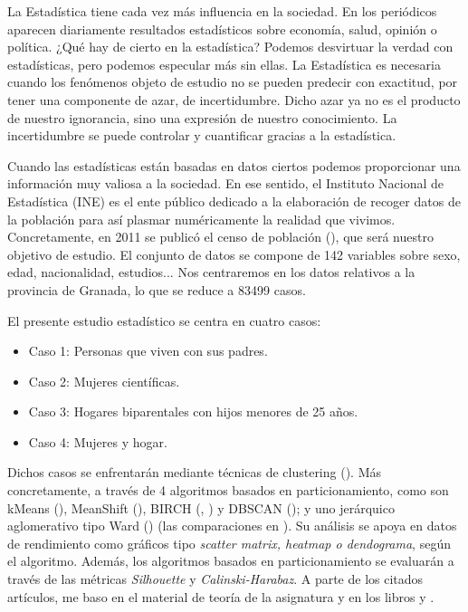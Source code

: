 La Estadística tiene cada vez más influencia en la sociedad. En los periódicos aparecen diariamente resultados estadísticos sobre economía, salud, opinión o política. ¿Qué hay de cierto en la estadística? Podemos desvirtuar la verdad con estadísticas, pero podemos especular más sin ellas. La Estadística es necesaria cuando los fenómenos objeto de estudio no se pueden predecir con exactitud, por tener una componente de azar, de incertidumbre. Dicho azar ya no es el producto de nuestro ignorancia, sino una expresión de nuestro conocimiento. La incertidumbre se puede controlar y cuantificar gracias a la estadística.

Cuando las estadísticas están basadas en datos ciertos podemos proporcionar una información muy valiosa a la sociedad. En ese sentido, el Instituto Nacional de Estadística (INE) es el ente público dedicado a la elaboración de recoger datos de la población para así plasmar numéricamente la realidad que vivimos. Concretamente, en 2011 se publicó el censo de población (\cite{censo}), que será nuestro objetivo de estudio. El conjunto de datos se compone de 142 variables sobre sexo, edad, nacionalidad, estudios... Nos centraremos en los datos relativos a la provincia de Granada, lo que se reduce a 83499 casos. 

El presente estudio estadístico se centra en cuatro casos:
\begin{itemize}
	\item Caso 1: Personas que viven con sus padres. 
	\item Caso 2: Mujeres científicas.
	\item Caso 3: Hogares biparentales con hijos menores de 25 años.
	\item Caso 4: Mujeres y hogar.
\end{itemize}

Dichos casos se enfrentarán mediante técnicas de clustering (\cite{jain1988algorithms}). Más concretamente, a través de 4 algoritmos basados en particionamiento, como son kMeans (\cite{kmeans}), MeanShift (\cite{ms}), BIRCH (\cite{birch}, \cite{zhang1996birch}) y DBSCAN (\cite{dbscan}); y uno jerárquico aglomerativo tipo Ward (\cite{ward}) (las comparaciones en \cite{steinbach2000comparison}). Su análisis se apoya en datos de rendimiento como gráficos tipo \textit{scatter matrix, heatmap o dendograma}, según el algoritmo. Además, los algoritmos basados en particionamiento se evaluarán a través de las métricas \textit{Silhouette} y \textit{Calinski-Harabaz}. A parte de los citados artículos, me baso en el material de teoría de la asignatura y en los libros \cite{data_mining_book} y \cite{fb_book}. \\

